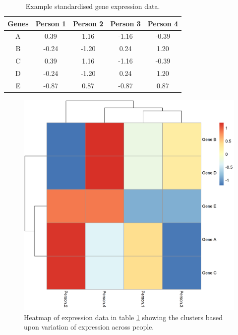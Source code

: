 \documentclass[12pt]{article} %
\begin{document}
	\begin{table}[] 
	\centering
	\begin{tabular}{c|cccc} 
	Genes 	& Person 1	& Person 2	& Person 3	& Person 4	\\ 
	\hline
	A 		& 0.39		& 1.16 		& -1.16		& -0.39		\\
	B 		& -0.24		& -1.20		& 0.24		& 1.20		\\
	C 		& 0.39		& 1.16		& -1.16		& -0.39		\\
	D 		& -0.24		& -1.20		& 0.24		& 1.20		\\
	E 		& -0.87		& 0.87		& -0.87		& 0.87		
	\end{tabular}
	\caption{Example standardised gene expression data.}
	\label{table:example_standardised_gene_expression_data}
	\end{table}
	
	\begin{figure}[h]
	\centering
		\includegraphics[scale=0.6]{Images/Examples/example_standardised_expression_data.png}
		\caption{Heatmap of expression data in table \ref{table:example_standardised_gene_expression_data} showing the clusters based upon variation of expression across people.}
		\label{fig:example_standardised_expression_data}
	\end{figure}
		
\end{document}
